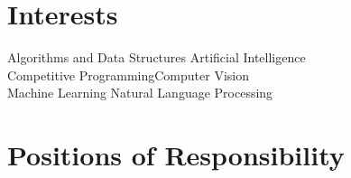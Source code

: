 \documentclass[a4paper]{norm-resume}
\begin{document}
\vspace{1mm}	%


\section{Interests}

\vspace{1mm} %

	{\large{
	{Algorithms and Data Structures \hfill Artificial Intelligence \\
	Competitive Programming\hfill Computer Vision\\
	Machine Learning \hfill Natural Language Processing\\}		
	}}

\vspace{2mm}	%


\section{Positions of Responsibility}

\vspace{2mm} %
		
\end{document}
